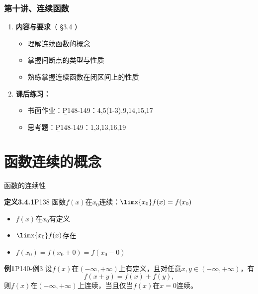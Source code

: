 \begin{frame}
	\frametitle{第十讲、连续函数}
	\linespread{1.5}
	\begin{enumerate}
	  \item {\bf 内容与要求}{\color{blue}（ \S3.4 ）}
	  \begin{itemize}
	    \item 理解连续函数的概念
	    \item 掌握间断点的类型与性质
	    \item 熟练掌握连续函数在闭区间上的性质
	  \vspace{1em}
	  \end{itemize}
	  \item {\bf 课后练习：}
	  \begin{itemize}
	    \item 书面作业：{\b P148-149：4,5(1-3),9,14,15,17}
	    \item 思考题：{\b P148-149：1,3,13,16,19}
	  \end{itemize}
	\end{enumerate}
\end{frame}

\section{函数连续的概念}

\begin{frame}{函数的连续性}
	\linespread{1.2}\pause 
	\begin{block}{{\bf 定义3.4.1}\hfill P138}
		{\bb 函数$f(x)$在$x_0$连续：}$\limx{x_0}f(x)=f(x_0)$
	\end{block}\pause 
	\begin{itemize}
	  \item $f(x)$在$x_0$有定义\pause 
	  \item $\limx{x_0}f(x)$存在\pause 
	  \item $f(x_0)=f(x_0+0)=f(x_0-0)$
	\end{itemize}
\end{frame}

\begin{frame}
	\linespread{1.2}
	\begin{exampleblock}{{\bf 例1}\hfill P140-例3}
		设$f(x)$在$(-\infty,+\infty)$上有定义，且对任意$x,y\in (-\infty,+\infty)$，有
		$$f(x+y)=f(x)+f(y),$$
		则$f(x)$在$(-\infty,+\infty)$上连续，当且仅当$f(x)$在$x=0$连续。
	\end{exampleblock}
\end{frame}

